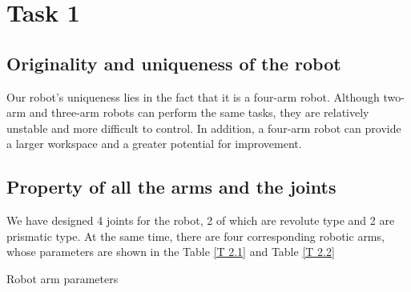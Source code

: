 \section{Task 1}
\FloatBarrier %


\subsection{Originality and uniqueness of the robot}

Our robot's uniqueness lies in the fact that it is a four-arm robot. Although two-arm and three-arm robots can perform the same tasks, they are relatively unstable and more difficult to control. In addition, a four-arm robot can provide a larger workspace and a greater potential for improvement.

\subsection{Property of all the arms and the joints}

We have designed 4 joints for the robot, 2 of which are revolute type and 2 are prismatic type. At the same time, there are four corresponding robotic arms, whose parameters are shown in the Table \ref{T 2.1} and Table \ref{T 2.2}

\begin{minipage}[htbp]{\textwidth}
    \makeatletter{}
    \centering
    \caption{Robot arm parameters}
    \label{T 2.1} 
\end{minipage}


